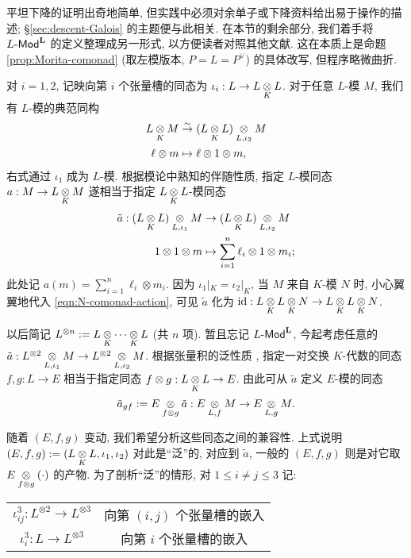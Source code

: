 平坦下降的证明出奇地简单, 但实践中必须对余单子或下降资料给出易于操作的描述; \S\ref{sec:descent-Galois} 的主题便与此相关. 在本节的剩余部分, 我们着手将 $L\text{-}\mathsf{Mod}^{\mathbf{L}}$ 的定义整理成另一形式, 以方便读者对照其他文献. 这在本质上是命题 \ref{prop:Morita-comonad} (取左模版本, $P = L = P^\vee$) 的具体改写, 但程序略微曲折.

对 $i = 1, 2$, 记映向第 $i$ 个张量槽的同态为 $\iota_i: L \to L \underset{K}{\otimes} L$. 对于任意 $L$-模 $M$, 我们有 $L$-模的典范同构
\begin{align*}
	L \underset{K}{\otimes} M & \stackrel{\sim}{\rightarrow} (L \underset{K}{\otimes} L) \underset{L, \iota_2}{\otimes} M \\
	\ell \otimes m & \mapsto \ell \otimes 1 \otimes m,
\end{align*}
右式通过 $\iota_1$ 成为 $L$-模. 根据模论中熟知的伴随性质, 指定 $L$-模同态 $a: M \to L \underset{K}{\otimes} M$ 遂相当于指定 $L \underset{K}{\otimes} L$-模同态
\begin{equation}\label{eqn:flat-descent-map-aux}\begin{aligned}
		\tilde{a}: (L \underset{K}{\otimes} L) \underset{L, \iota_1}{\otimes} M & \to (L \underset{K}{\otimes} L) \underset{L, \iota_2}{\otimes} M \\
		1 \otimes 1 \otimes m & \mapsto \sum_{i=1}^n \ell_i \otimes 1 \otimes m_i ;
\end{aligned}\end{equation}
此处记 $a(m) = \sum_{i=1}^n \ell_i \otimes m_i$. 因为 $\iota_1 |_K = \iota_2 |_K$, 当 $M$ 来自 $K$-模 $N$ 时, 小心翼翼地代入 \eqref{eqn:N-comonad-action}, 可见 $\tilde{a}$ 化为 $\mathrm{id}: L \underset{K}{\otimes} L \underset{K}{\otimes} N \to L \underset{K}{\otimes} L \underset{K}{\otimes} N$.

以后简记 $L^{\otimes n} := L \underset{K}{\otimes} \cdots \underset{K}{\otimes} L$ (共 $n$ 项). 暂且忘记 $L\text{-}\mathsf{Mod}^{\mathbf{L}}$, 今起考虑任意的 $\tilde{a}: L^{\otimes 2} \underset{L, \iota_1}{\otimes} M \to L^{\otimes 2} \underset{L, \iota_2}{\otimes} M$. 根据张量积的泛性质 \cite[命题 7.3.4]{Li1}, 指定一对交换 $K$-代数的同态 $f, g: L \to E$ 相当于指定同态 $f \otimes g: L \underset{K}{\otimes} L \to E$. 由此可从 $\tilde{a}$ 定义 $E$-模的同态
\begin{equation*}
	\tilde{a}_{gf} := E \underset{f \otimes g}{\otimes} \tilde{a}: E \underset{L, f}{\otimes} M \to E \underset{L, g}{\otimes} M.
\end{equation*}

随着 $(E, f, g)$ 变动, 我们希望分析这些同态之间的兼容性. 上式说明 $(E, f, g) := (L \underset{K}{\otimes} L, \iota_1, \iota_2)$ 对此是``泛''的, 对应到 $\tilde{a}$, 一般的 $(E, f, g)$ 则是对它取 $E \underset{f \otimes g}{\otimes} (\cdot)$ 的产物. 为了剖析``泛''的情形, 对 $1 \leq i \neq j \leq 3$ 记:
\begin{center}\begin{tabular}{|c|c|} \hline
		$\iota^3_{ij}: L^{\otimes 2} \to L^{\otimes 3}$ & 向第 $(i, j)$ 个张量槽的嵌入 \\
		$\iota^3_i: L \to L^{\otimes 3}$ & 向第 $i$ 个张量槽的嵌入 \\ \hline
\end{tabular}\end{center}

